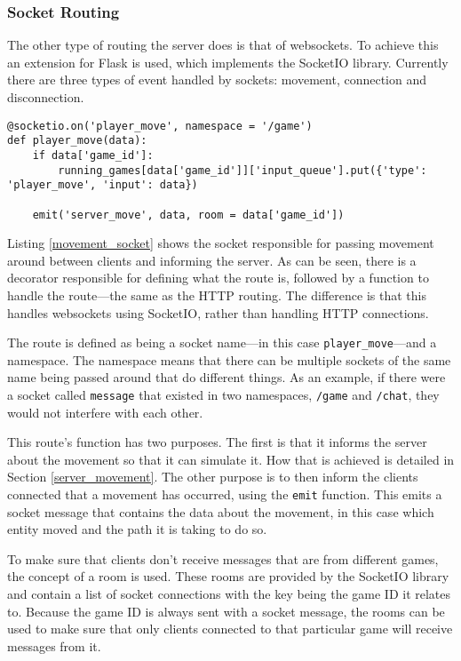 \subsubsection{Socket Routing}
The other type of routing the server does is that of websockets. To achieve this an extension for Flask is used, which implements the SocketIO library. Currently there are three types of event handled by sockets: movement, connection and disconnection.

\noindent
\begin{minipage}{\linewidth}
\begin{lstlisting}[style=py, caption={Socket for passing movement events between clients and server.}, label=movement_socket]
@socketio.on('player_move', namespace = '/game')
def player_move(data):
    if data['game_id']:
        running_games[data['game_id']]['input_queue'].put({'type': 'player_move', 'input': data})

    emit('server_move', data, room = data['game_id'])
\end{lstlisting}
\end{minipage}

Listing \ref{movement_socket} shows the socket responsible for passing movement around between clients and informing the server. As can be seen, there is a decorator responsible for defining what the route is, followed by a function to handle the route---the same as the HTTP routing. The difference is that this handles websockets using SocketIO, rather than handling HTTP connections.

The route is defined as being a socket name---in this case \texttt{player\_move}---and a namespace. The namespace means that there can be multiple sockets of the same name being passed around that do different things. As an example, if there were a socket called \texttt{message} that existed in two namespaces, \texttt{/game} and \texttt{/chat}, they would not interfere with each other.

This route's function has two purposes. The first is that it informs the server about the movement so that it can simulate it. How that is achieved is detailed in Section \ref{server_movement}. The other purpose is to then inform the clients connected that a movement has occurred, using the \texttt{emit} function. This emits a socket message that contains the data about the movement, in this case which entity moved and the path it is taking to do so.

To make sure that clients don't receive messages that are from different games, the concept of a room is used. These rooms are provided by the SocketIO library and contain a list of socket connections with the key being the game ID it relates to. Because the game ID is always sent with a socket message, the rooms can be used to make sure that only clients connected to that particular game will receive messages from it.

